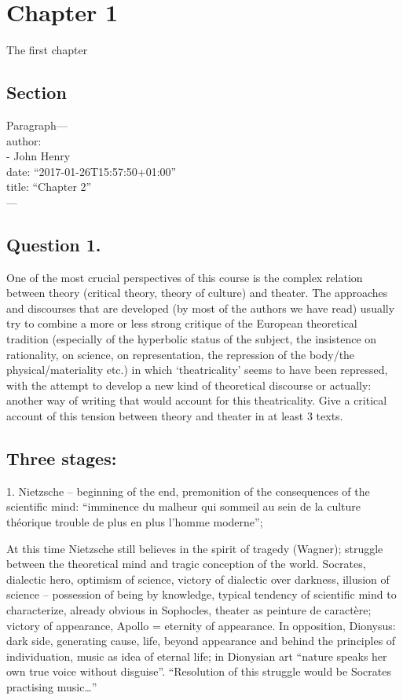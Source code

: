 \documentclass[oneside]{memoir}
\let\oldsection\section
\renewcommand\section{\clearpage\gdef\znewpage{\global\let\znewpage\clearpage}\oldsection}
\begin{document}
\chapter{Chapter 1}\label{chapter-1}

The first chapter

\section{Section}\label{section}

Paragraph---\\
author:\\
- John Henry\\
date: ``2017-01-26T15:57:50+01:00''\\
title: ``Chapter 2''\\
---

\section{Question 1.}\label{question-1.}

One of the most crucial perspectives of this course is the complex
relation between theory (critical theory, theory of culture) and
theater. The approaches and discourses that are developed (by most of
the authors we have read) usually try to combine a more or less strong
critique of the European theoretical tradition (especially of the
hyperbolic status of the subject, the insistence on rationality, on
science, on representation, the repression of the body/the
physical/materiality etc.) in which `theatricality' seems to have been
repressed, with the attempt to develop a new kind of theoretical
discourse or actually: another way of writing that would account for
this theatricality. Give a critical account of this tension between
theory and theater in at least 3 texts.

\section{Three stages:}\label{three-stages}

1. Nietzsche -- beginning of the end, premonition of the consequences of
the scientific mind: ``imminence du malheur qui sommeil au sein de la
culture théorique trouble de plus en plus l'homme moderne'';

At this time Nietzsche still believes in the spirit of tragedy (Wagner);
struggle between the theoretical mind and tragic conception of the
world. Socrates, dialectic hero, optimism of science, victory of
dialectic over darkness, illusion of science -- possession of being by
knowledge, typical tendency of scientific mind to characterize, already
obvious in Sophocles, theater as peinture de caractère; victory of
appearance, Apollo = eternity of appearance. In opposition, Dionysus:
dark side, generating cause, life, beyond appearance and behind the
principles of individuation, music as idea of eternal life; in Dionysian
art ``nature speaks her own true voice without disguise''. ``Resolution
of this struggle would be Socrates practising music\ldots{}''
\end{document}
